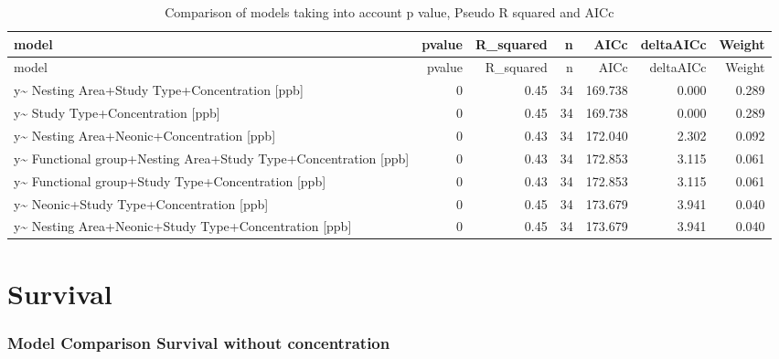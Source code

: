 \documentclass[]{elsarticle} %
\begin{document}
\begin{longtable}[c]{@{}lrrrrrr@{}}
\caption{Comparison of models taking into account p value, Pseudo R
squared and AICc}\tabularnewline
\toprule
model & pvalue & R\_squared & n & AICc & deltaAICc &
Weight\tabularnewline
\midrule
\endfirsthead
\toprule
model & pvalue & R\_squared & n & AICc & deltaAICc &
Weight\tabularnewline
\midrule
\endhead
y\textasciitilde{} Nesting Area+Study Type+Concentration {[}ppb{]} & 0 &
0.45 & 34 & 169.738 & 0.000 & 0.289\tabularnewline
y\textasciitilde{} Study Type+Concentration {[}ppb{]} & 0 & 0.45 & 34 &
169.738 & 0.000 & 0.289\tabularnewline
y\textasciitilde{} Nesting Area+Neonic+Concentration {[}ppb{]} & 0 &
0.43 & 34 & 172.040 & 2.302 & 0.092\tabularnewline
y\textasciitilde{} Functional group+Nesting Area+Study
Type+Concentration {[}ppb{]} & 0 & 0.43 & 34 & 172.853 & 3.115 &
0.061\tabularnewline
y\textasciitilde{} Functional group+Study Type+Concentration {[}ppb{]} &
0 & 0.43 & 34 & 172.853 & 3.115 & 0.061\tabularnewline
y\textasciitilde{} Neonic+Study Type+Concentration {[}ppb{]} & 0 & 0.45
& 34 & 173.679 & 3.941 & 0.040\tabularnewline
y\textasciitilde{} Nesting Area+Neonic+Study Type+Concentration
{[}ppb{]} & 0 & 0.45 & 34 & 173.679 & 3.941 & 0.040\tabularnewline
\bottomrule
\end{longtable}

\section{Survival}\label{survival}

\subsubsection{Model Comparison Survival without
concentration}\label{model-comparison-survival-without-concentration}
\end{document}
